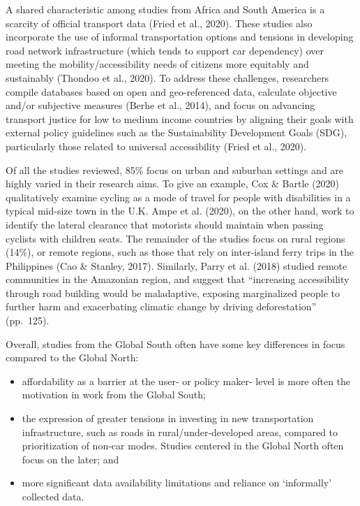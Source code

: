 \documentclass[
  letterpaper,
  DIV=11,
  numbers=noendperiod]{scrartcl}
\begin{document}
A shared characteristic among studies from Africa and South America is a
scarcity of official transport data (Fried et al., 2020). These studies
also incorporate the use of informal transportation options and tensions
in developing road network infrastructure (which tends to support car
dependency) over meeting the mobility/accessibility needs of citizens
more equitably and sustainably (Thondoo et al., 2020). To address these
challenges, researchers compile databases based on open and
geo-referenced data, calculate objective and/or subjective measures
(Berhe et al., 2014), and focus on advancing transport justice for low
to medium income countries by aligning their goals with external policy
guidelines such as the Sustainability Development Goals (SDG),
particularly those related to universal accessibility (Fried et al.,
2020).

Of all the studies reviewed, 85\% focus on urban and suburban settings
and are highly varied in their research aims. To give an example, Cox \&
Bartle (2020) qualitatively examine cycling as a mode of travel for
people with disabilities in a typical mid-size town in the U.K. Ampe et
al. (2020), on the other hand, work to identify the lateral clearance
that motorists should maintain when passing cyclists with children
seats. The remainder of the studies focus on rural regions (14\%), or
remote regions, such as those that rely on inter-island ferry trips in
the Philippines (Cao \& Stanley, 2017). Similarly, Parry et al. (2018)
studied remote communities in the Amazonian region, and suggest that
``increasing accessibility through road building would be maladaptive,
exposing marginalized people to further harm and exacerbating climatic
change by driving deforestation'' (pp.~125).

Overall, studies from the Global South often have some key differences
in focus compared to the Global North:

\begin{itemize}
\item
  affordability as a barrier at the user- or policy maker- level is more
  often the motivation in work from the Global South;
\item
  the expression of greater tensions in investing in new transportation
  infrastructure, such as roads in rural/under-developed areas, compared
  to prioritization of non-car modes. Studies centered in the Global
  North often focus on the later; and
\item
  more significant data availability limitations and reliance on
  `informally' collected data.
\end{itemize}
\end{document}
